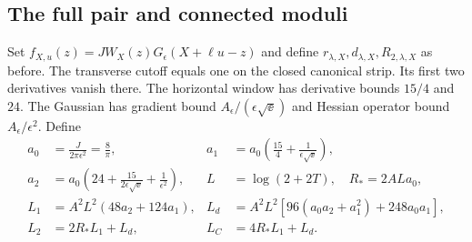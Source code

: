 \subsection{The full pair and connected moduli}

Set $f_{X,u}(z)=JW_X(z)G_\epsilon(X+\ell u-z)$ and define
$r_{\lambda,X},d_{\lambda,X},R_{2,\lambda,X}$ as before.
The transverse cutoff equals one on the closed canonical strip.
Its first two derivatives vanish there. The horizontal
window has derivative bounds $15/4$ and $24$. The Gaussian has
gradient bound $A_\epsilon/(\epsilon\sqrt{\ee})$ and Hessian operator
bound $A_\epsilon/\epsilon^2$. Define
\begin{align}
 a_0&=\frac{J}{2\pi\epsilon^2}=\frac8\pi,&
 a_1&=a_0\left(\frac{15}4+\frac1{\epsilon\sqrt{\ee}}\right),\nonumber\\
 a_2&=a_0\left(24+\frac{15}{2\epsilon\sqrt{\ee}}+\frac1{\epsilon^2}\right),&
 L&=\log(2+2T),\quad R_*=2ALa_0,\nonumber\\
 L_1&=A^2L^2(48a_2+124a_1),&
 L_d&=A^2L^2[96(a_0a_2+a_1^2)+248a_0a_1],\nonumber\\
 L_2&=2R_*L_1+L_d,&L_C&=4R_*L_1+L_d.
                                                        \label{eq:time-constants}
\end{align}

